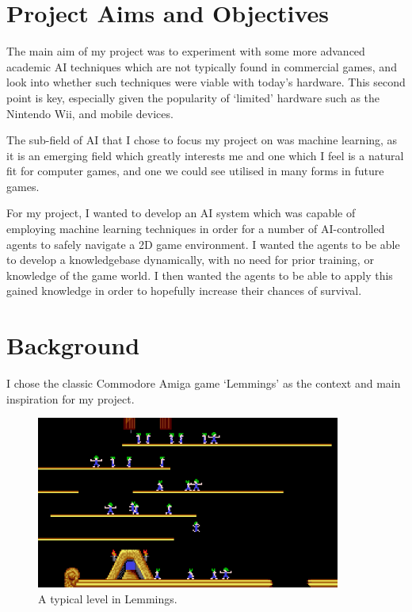 \documentclass[a4paper,oneside]{report}
\begin{document}
\section{Project Aims and Objectives}

The main aim of my project was to experiment with some more advanced academic AI techniques which are not typically found in commercial games, and look into whether such techniques were viable with today's hardware. This second point is key, especially given the popularity of `limited' hardware such as the Nintendo Wii, and mobile devices.

The sub-field of AI that I chose to focus my project on was machine learning, as it is an emerging field which greatly interests me and one which I feel is a natural fit for computer games, and one we could see utilised in many forms in future games.

For my project, I wanted to develop an AI system which was capable of employing machine learning techniques in order for a number of AI-controlled agents to safely navigate a 2D game environment. I wanted the agents to be able to develop a knowledgebase dynamically, with no need for prior training, or knowledge of the game world. I then wanted the agents to be able to apply this gained knowledge in order to hopefully increase their chances of survival. 

\section{Background}

I chose the classic Commodore Amiga game `Lemmings' as the context and main inspiration for my project.

\begin{figure}[h!]
  \centering
    \includegraphics[width=100mm]{sources/images/lemmings3}
    \caption{A typical level in Lemmings.\label{screen}}
\end{figure}
\end{document}

